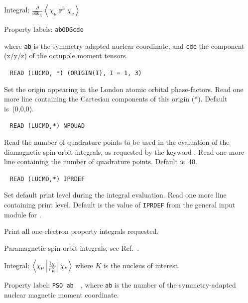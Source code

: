 \begin{description}
\begin{list}{}{}
\item Integral: $\frac{\partial}{\partial {\mathbf
R}_K}\left<\chi_{\mu}\left|{\mathbf r}^3\right|\chi_{\nu}\right>$ 
\item Property labels: \verb|abODGcde|
\end{list}
where \verb|ab| is the symmetry adapted nuclear coordinate, and \verb|cde| the
component (x/y/z) of the octupole moment tensors.


\item[\Key{PHASEO}]\verb| |\newline
\verb|READ (LUCMD, *) (ORIGIN(I), I = 1, 3)|

Set the origin appearing in the London atomic orbital phase-factors.
Read one more line containing the Cartesian components of this origin (*).
Default is~(0,0,0).

\item[\Key{POINTS}]\verb| |\newline
\verb|READ (LUCMD,*) NPQUAD|

Read the number of quadrature points to be
used in the evaluation of
the diamagnetic spin-orbit integrals, as
requested by the keyword
. Read one more line containing the number of quadrature
points. Default is~40.

\item[\Key{PRINT}]\verb| |\newline
\verb|READ (LUCMD,*) IPRDEF|

Set default print level during the integral evaluation.  Read one more line
containing print level. Default is the value of \verb|IPRDEF|
from the general input module for \siraba .

\item[\Key{PROPRI}] Print all one-electron property integrals requested.

\item[\Key{PSO}] Paramagnetic spin-orbit integrals, see
Ref.~\cite{ovhapjhjajsbpthjcp96}.

\begin{list}{}{}
\item Integral:
$\left<\chi_{\mu}\left|\frac{{\bf l}_K}{r_{K}^{3}}\right|\chi_{\nu}\right>$
where $K$ is the nucleus of interest.
\item Property label: \verb|PSO ab  |, where \verb|ab| is the number
of the symmetry-adapted nuclear magnetic moment coordinate.
\end{list}


\end{description}
